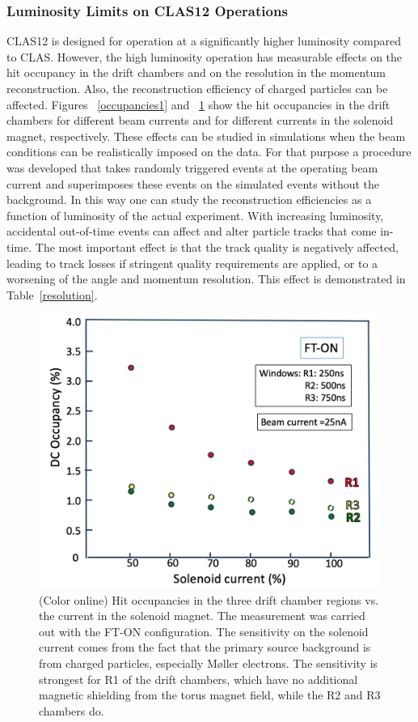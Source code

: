 \documentclass[final,3p,twocolumn]{elsarticle}
\begin{document}
\subsubsection{Luminosity Limits on CLAS12 Operations}

CLAS12 is designed for operation at a significantly higher luminosity compared to CLAS. However, the high luminosity
operation has measurable effects on the hit occupancy in the drift chambers and on the resolution in the momentum
reconstruction. Also, the reconstruction efficiency of charged particles can be affected. Figures ~\ref{occupancies1}
and ~\ref{occupancies2} show the hit occupancies in the drift chambers for different beam currents and for different
currents in the solenoid magnet, respectively. These effects can be studied in simulations when the beam conditions can
be realistically imposed on the data. For that purpose a procedure was developed that takes randomly triggered events
at the operating beam current and superimposes these events on the simulated events without the background. In this
way one can study the reconstruction efficiencies as a function of luminosity of the actual experiment. With increasing
luminosity, accidental out-of-time events can affect and alter particle tracks that come in-time. The most important
effect is that the track quality is negatively affected, leading to track losses if stringent quality requirements are
applied, or to a worsening of the angle and momentum resolution. This effect is demonstrated in Table~\ref{resolution}.   

\begin{figure}[t!]
\centerline{\includegraphics[width=1.0\columnwidth]{occupancy-solenoid.png}}
\caption{(Color online) Hit occupancies in the three drift chamber regions vs. the current in the solenoid magnet. The
  measurement was carried out with the FT-ON configuration. The sensitivity on the solenoid current comes from
  the fact that the primary source background is from charged particles, especially M{\o}ller electrons. The
  sensitivity is strongest for R1 of the drift chambers, which have no additional magnetic shielding from the torus
  magnet field, while the R2 and R3 chambers do.}
\label{occupancies2}
\end{figure}
\end{document}
